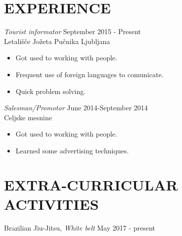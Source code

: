 \documentclass[margin, 10pt]{res} %
\begin{document}
\begin{resume}
 
\section{EXPERIENCE}

{\sl Tourist informator} \hfill September 2015 - Present \\
Letališče Jo\v{z}eta Pu\v{c}nika Ljubljana
\begin{itemize}
\item Got used to working with people.
\item Frequent use of foreign languages to comunicate.
\item Quick problem solving.
\end{itemize} 

{\sl Salesman/Promotor} \hfill June 2014-September 2014\\
Celjske mesnine
\begin{itemize}
\item Got used to working with people.
\item Learned some advertising techniques.
\end{itemize} 



\section{EXTRA-CURRICULAR \\ ACTIVITIES} 

Brazilian Jiu-Jitsu, {\sl White belt} \hfill May 2017 - present\\
 


\end{resume}
\end{document}
